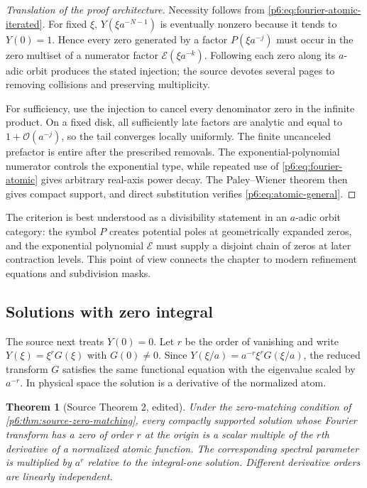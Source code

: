 \documentclass[11pt,oneside]{article}
\numberwithin{equation}{section}
\newtheorem{theorem}{Theorem}[section]
\theoremstyle{definition}
\theoremstyle{remark}
\newcommand{\bigO}{\mathcal O}
\begin{document}
\begin{proof}[Translation of the proof architecture]
Necessity follows from \eqref{p6:eq:fourier-atomic-iterated}.  For fixed $\xi$,
$Y(\xi a^{-N-1})$ is eventually nonzero because it tends to $Y(0)=1$.  Hence
every zero generated by a factor $P(\xi a^{-j})$ must occur in the zero multiset
of a numerator factor $\mathcal E(\xi a^{-k})$.  Following each zero along its
$a$-adic orbit produces the stated injection; the source devotes several pages
to removing collisions and preserving multiplicity.

For sufficiency, use the injection to cancel every denominator zero in the
infinite product.  On a fixed disk, all sufficiently late factors are analytic
and equal to $1+\bigO(a^{-j})$, so the tail converges locally uniformly.  The
finite uncanceled prefactor is entire after the prescribed removals.  The
exponential-polynomial numerator controls the exponential type, while repeated
use of \eqref{p6:eq:fourier-atomic} gives arbitrary real-axis power decay.  The
Paley--Wiener theorem then gives compact support, and direct substitution verifies
\eqref{p6:eq:atomic-general}.
\end{proof}

\begin{remark}
The criterion is best understood as a divisibility statement in an $a$-adic
orbit category: the symbol $P$ creates potential poles at geometrically expanded
zeros, and the exponential polynomial $\mathcal E$ must supply a disjoint chain
of zeros at later contraction levels.  This point of view connects the chapter
to modern refinement equations and subdivision masks.
\end{remark}

\subsection{Solutions with zero integral}

The source next treats $Y(0)=0$.  Let $r$ be the order of vanishing and write
$Y(\xi)=\xi^rG(\xi)$ with $G(0)\ne0$.  Since
$Y(\xi/a)=a^{-r}\xi^rG(\xi/a)$, the reduced transform $G$ satisfies the same
functional equation with the eigenvalue scaled by $a^{-r}$.  In physical space
the solution is a derivative of the normalized atom.

\begin{theorem}[Source Theorem 2, edited]\label{p6:thm:source-derivative-tower}
Under the zero-matching condition of \cref{p6:thm:source-zero-matching}, every
compactly supported solution whose Fourier transform has a zero of order $r$ at
the origin is a scalar multiple of the $r$th derivative of a normalized atomic
function.  The corresponding spectral parameter is multiplied by $a^r$ relative
to the integral-one solution.  Different derivative orders are linearly
independent.
\end{theorem}
\end{document}
